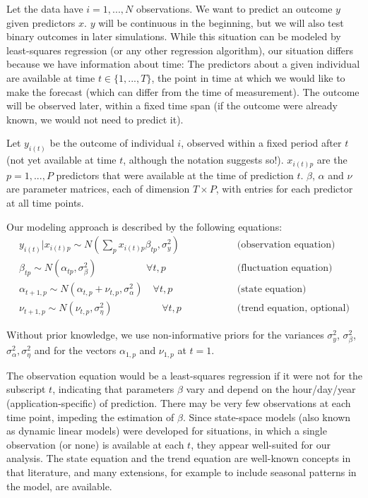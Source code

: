 \documentclass{article}
\begin{document}
Let the data have $i = 1, ..., N$ observations. We want to predict an outcome $y$ given predictors $x$. $y$ will be continuous in the beginning, but we will also test binary outcomes in later simulations. While this situation can be modeled by least-squares regression (or any other regression algorithm), our situation differs because we have information about time: The predictors about a given individual are available at time $t \in \{1, ..., T\}$, the point in time at which we would like to make the forecast (which can differ from the time of measurement). The outcome will be observed later, within a fixed time span (if the outcome were already known, we would not need to predict it).

Let $y_{i(t)}$ be the outcome of individual $i$, observed within a fixed period after $t$ (not yet available at time $t$, although the notation suggests so!). $x_{i(t)p}$ are the $p = 1, ..., P$ predictors that were available at the time of prediction $t$. $\beta$, $\alpha$ and $\nu$ are parameter matrices, each of dimension $T \times P$, with entries for each predictor at all time points.

Our modeling approach is described by the following equations:
\begin{eqnarray}
y_{i(t)} | x_{i(t)p} \sim N(\sum_p x_{i(t)p} \beta_{tp}, \sigma_y^2) \textrm{~~~~~~~~~~~~~~~} & \textrm{(observation equation)} \\
\beta_{tp} \sim N(\alpha_{tp}, \sigma^2_{\beta}) \textrm{~~~~~~~~~~~~~~~} \forall t,p \textrm{~~~~~~~} & \textrm{(fluctuation equation)} \\
\alpha_{t+1,p} \sim N(\alpha_{t,p} + \nu_{t,p}, \sigma^2_{\alpha}) \textrm{~~~} \forall t,p \textrm{~~~~~~~} & \textrm{(state equation)} \\
\nu_{t+1,p} \sim N(\nu_{t,p}, \sigma^2_{\eta})\textrm{~~~~~~~~~~~~~~~} \forall t,p\textrm{~~~~~~~} & \textrm{(trend equation, optional)}
\end{eqnarray}

Without prior knowledge, we use non-informative priors for the variances $\sigma_y^2$, $\sigma^2_{\beta}$, $\sigma^2_{\alpha}, \sigma^2_{\eta}$ and for the vectors $\alpha_{1,p}$ and $\nu_{1,p}$ at $t=1$.

The observation equation would be a least-squares regression if it were not for the subscript $t$, indicating that parameters $\beta$ vary and depend on the hour/day/year (application-specific) of prediction. There may be very few observations at each time point, impeding the estimation of $\beta$. Since state-space models (also known as dynamic linear models) \citep{prado_time_2010, shumway_time_2011, durbin_time_2012} were developed for situations, in which a single observation (or none) is available at each $t$, they appear well-suited for our analysis. The state equation and the trend equation are well-known concepts in that literature, and many extensions, for example to include seasonal patterns in the model, are available.
\end{document}
